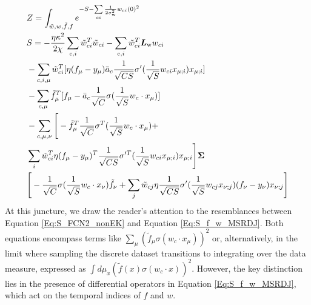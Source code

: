 \begin{align}\label{Eq:S_f_w_MSRDJ}
    &Z=
    \int_{\tilde{w},w,\tilde{f},f}e^{-S-\sum\limits_{ci}\frac{1}{2\sigma_{\rm w}^2}w_{ci}(0)^2} \\ \nonumber
    &S=-\frac{\eta\kappa^2}{2\chi}\sum\limits_{c,i} \tilde{w}_{ci}^T \tilde{w}_{ci} -\sum\limits_{c,i} \tilde{w}_{ci}^T \bm{L}_{\rm w} w_{ci} \\ \nonumber
   & - \sum\limits_{c,i,\mu}\tilde{w}_{ci}^T [\eta (f_{\mu}-y_\mu) \bar{a}_{c} \frac{1}{\sqrt{CS}}\sigma'(\frac{1}{\sqrt{S}} w_{ci} x_{\mu;i}) x_{\mu;i}] \\ \nonumber
    &-\sum\limits_{c,\mu}\tilde{f}_{\mu}^T[f_{\mu}-\bar{a}_c \frac{1}{\sqrt{C}}{\sigma}(\frac{1}{\sqrt{S}} w_c\cdot x_{\mu})] \\ \nonumber
    &-\sum\limits_{c,\mu,\nu}\Bigg[-\tilde{f}_{\mu}^T
  \frac{1}{\sqrt{C}}\sigma^T(\frac{1}{\sqrt{S}} w_c\cdot x_{\mu})
+\\ \nonumber&
\sum\limits_{i}\tilde{w}_{ci}^T
\eta (f_{\mu}-y_\mu)^T \frac{1}{\sqrt{CS}}\sigma'^T(\frac{1}{\sqrt{S}} w_{ci} x_{\mu;i}) x_{\mu;i}\Bigg] 
\bm{\Sigma}\\ \nonumber
&\Bigg[-  \frac{1}{\sqrt{C}}\sigma(\frac{1}{\sqrt{S}} w_c\cdot x_{\nu}) \tilde{f}_{\nu}
+
\sum\limits_{j}\tilde{w}_{cj}
\eta  \frac{1}{\sqrt{CS}} \sigma'( \frac{1}{\sqrt{S}} w_{cj} x_{\nu;j}) (f_{\nu}-y_\nu) x_{\nu;j}\Bigg] 
\end{align}
At this juncture, we draw the reader's attention to the resemblances between Equation \ref{Eq:S_FCN2_nonEK} and Equation \ref{Eq:S_f_w_MSRDJ}. Both equations encompass terms like $\sum_\mu(\tilde{f}_\mu\sigma(w_c\cdot x_\mu))^2$ or, alternatively, in the limit where sampling the discrete dataset transitions to integrating over the data measure, expressed as $\int d\mu_x(\tilde{f}(x)\sigma(w_c\cdot x))^2$. However, the key distinction lies in the presence of differential operators in Equation \ref{Eq:S_f_w_MSRDJ}, which act on the temporal indices of $f$ and $w$.
